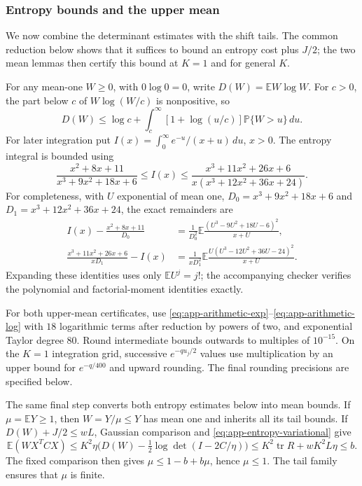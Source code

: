 \documentclass[11pt,a4paper]{article}
\numberwithin{equation}{section}
\begin{document}
\subsubsection{Entropy bounds and the upper mean}
We now combine the determinant estimates with the shift tails. The common
reduction below shows that it suffices to bound an entropy cost plus $J/2$;
the two mean lemmas then certify this bound at $K=1$ and for general $K$.

For any mean-one $W\ge0$, with $0\log0=0$, write $D(W)=\mathbb EW\log W$.
For $c>0$, the part below $c$ of $W\log(W/c)$ is nonpositive, so
\begin{equation}\label{eq:app-up-entropy-integration}
 D(W)\le\log c+\int_c^\infty[1+\log(u/c)]\mathbb P\{W>u\}\,du.
\end{equation}
For later integration put $I(x)=\int_0^\infty e^{-u}/(x+u)\,du$, $x>0$.
The entropy integral is bounded using
\[
 \frac{x^2+8x+11}{x^3+9x^2+18x+6}
 \le I(x)\le
 \frac{x^3+11x^2+26x+6}{x(x^3+12x^2+36x+24)}.
\]
For completeness, with $U$ exponential of mean one,
$D_0=x^3+9x^2+18x+6$ and $D_1=x^3+12x^2+36x+24$, the exact remainders are
\[
 \begin{aligned}
 I(x)-\frac{x^2+8x+11}{D_0}
 &=\frac1{D_0^2}\mathbb E
       \frac{(U^3-9U^2+18U-6)^2}{x+U},\\
 \frac{x^3+11x^2+26x+6}{xD_1}-I(x)
 &=\frac1{xD_1^2}\mathbb E
       \frac{U(U^3-12U^2+36U-24)^2}{x+U}.
 \end{aligned}
\]
Expanding these identities uses only $\mathbb EU^j=j!$;
the accompanying checker verifies the polynomial and factorial-moment
identities exactly.

For both upper-mean certificates, use
\eqref{eq:app-arithmetic-exp}--\eqref{eq:app-arithmetic-log}
with $18$ logarithmic terms after reduction by powers of two, and
exponential Taylor degree $80$.
Round intermediate bounds outwards to multiples of $10^{-15}$.
On the $K=1$ integration grid, successive $e^{-qu_j/2}$ values use
multiplication by an upper bound for $e^{-q/400}$ and upward rounding.
The final rounding precisions are specified below.

The same final step converts both entropy estimates below into mean bounds.
If $\mu=\mathbb EY\ge1$, then $W=Y/\mu\le Y$ has mean one and inherits
all its tail bounds. If $D(W)+J/2\le wL$, Gaussian comparison and
\eqref{eq:app-entropy-variational} give
\[
 \mathbb E(WX^TCX)\le K^2\eta\bigl(D(W)-\tfrac12\log\det(I-2C/\eta)\bigr)
 \le K^2\operatorname{tr}R+wK^2L\eta\le b.
\]
The fixed comparison then gives $\mu\le1-b+b\mu$, hence $\mu\le1$.
The tail family ensures that $\mu$ is finite.
\end{document}
